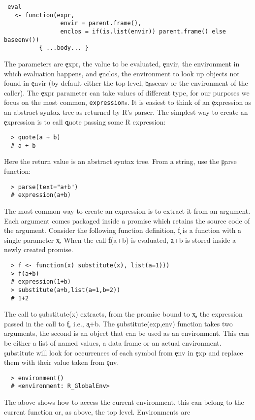 \documentclass[acmsmall]{acmart}
\begin{document}
\begin{lstlisting}
 eval
   <- function(expr,
                envir = parent.frame(),
                enclos = if(is.list(envir)) parent.frame() else baseenv())
          { ...body... }
\end{lstlisting}
The parameters are \c{expr}, the value to be evaluated, \c{envir}, the
environment in which evaluation happens, and \c{enclos}, the
environment to look up objects not found in \c{envir} (by default
either the top level, \c{baseenv} or the environment of the caller).
The \c{expr} parameter can take values of different type, for our
purposes we focus on the most common, {\tt expression}s. It is easiest
to think of an \c{expression} as an abstract syntax tree as returned
by R's parser. The simplest way to create an \c{expression} is to call
\c{quote} passing some R expression:
\begin{lstlisting}
  > quote(a + b)
  # a + b
\end{lstlisting}
Here the return value is an abstract syntax tree. From a
string, use  the \c{parse} function:
\begin{lstlisting}
  > parse(text="a+b")
  # expression(a+b)
\end{lstlisting}
The most common way to create an expression is to extract it from an
argument. Each argument comes packaged inside a promise which retains
the source code of the argument. Consider the following function
definition, \c{f} is a function with a single parameter \c{x}. When
the call \c{f(a+b)} is evaluated, \c{a+b} is stored inside a newly
created promise.
\begin{lstlisting}
  > f <- function(x) substitute(x), list(a=1)))
  > f(a+b)
  # expression(1+b)
  > substitute(a+b,list(a=1,b=2))
  # 1+2
\end{lstlisting}
The call to \c{substitute(x)} extracts, from the promise bound to
\c{x}, the expression passed in the call to \c{f}, i.e., \c{a+b}. The
\c{substitute(exp,env)} function takes two arguments, the second is an
object that can be used as an environment. This can be either a list
of named values, a data frame or an actual environment. \c{substitute}
will look for occurrences of each symbol from \c{env} in \c{exp} and
replace them with their value taken from \c{env}.
\begin{lstlisting}
  > environment()
  # <environment: R_GlobalEnv>
\end{lstlisting}
The above shows how to access the current environment, this can belong
to the current function or, as above, the top level. Environments are
\end{document}
